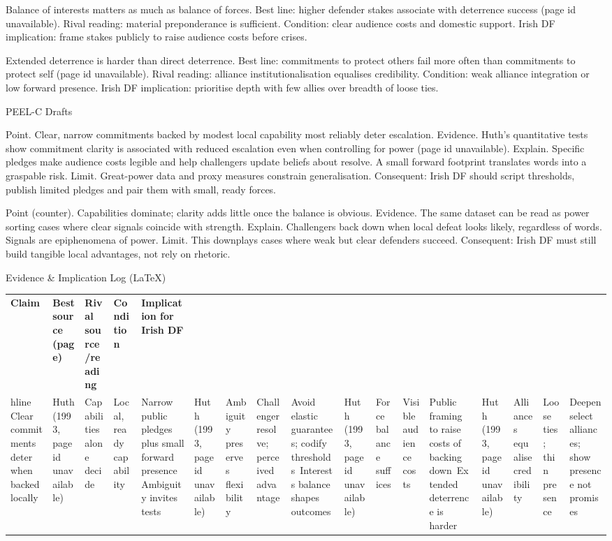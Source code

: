 Balance of interests matters as much as balance of forces.
Best line: higher defender stakes associate with deterrence success (page id unavailable).
Rival reading: material preponderance is sufficient.
Condition: clear audience costs and domestic support.
Irish DF implication: frame stakes publicly to raise audience costs before crises.

Extended deterrence is harder than direct deterrence.
Best line: commitments to protect others fail more often than commitments to protect self (page id unavailable).
Rival reading: alliance institutionalisation equalises credibility.
Condition: weak alliance integration or low forward presence.
Irish DF implication: prioritise depth with few allies over breadth of loose ties.

PEEL-C Drafts

Point. Clear, narrow commitments backed by modest local capability most reliably deter escalation.
Evidence. Huth’s quantitative tests show commitment clarity is associated with reduced escalation even when controlling for power (page id unavailable).
Explain. Specific pledges make audience costs legible and help challengers update beliefs about resolve. A small forward footprint translates words into a graspable risk.
Limit. Great-power data and proxy measures constrain generalisation. Consequent: Irish DF should script thresholds, publish limited pledges and pair them with small, ready forces.

Point (counter). Capabilities dominate; clarity adds little once the balance is obvious.
Evidence. The same dataset can be read as power sorting cases where clear signals coincide with strength.
Explain. Challengers back down when local defeat looks likely, regardless of words. Signals are epiphenomena of power.
Limit. This downplays cases where weak but clear defenders succeed. Consequent: Irish DF must still build tangible local advantages, not rely on rhetoric.

Evidence & Implication Log (LaTeX)

\usepackage{array}
\begin{tabular}{p{3.2cm}p{4.2cm}p{3.6cm}p{3.2cm}p{4.2cm}}
	\textbf{Claim} & \textbf{Best source (page)} & \textbf{Rival source/reading} & \textbf{Condition} & \textbf{Implication for Irish DF}\\hline
	Clear commitments deter when backed locally & Huth (1993, page id unavailable) & Capabilities alone decide & Local, ready capability & Narrow public pledges plus small forward presence\
	Ambiguity invites tests & Huth (1993, page id unavailable) & Ambiguity preserves flexibility & Challenger resolve; perceived advantage & Avoid elastic guarantees; codify thresholds\
	Interests balance shapes outcomes & Huth (1993, page id unavailable) & Force balance suffices & Visible audience costs & Public framing to raise costs of backing down\
	Extended deterrence is harder & Huth (1993, page id unavailable) & Alliances equalise credibility & Loose ties; thin presence & Deepen select alliances; show presence not promises\
\end{tabular}

